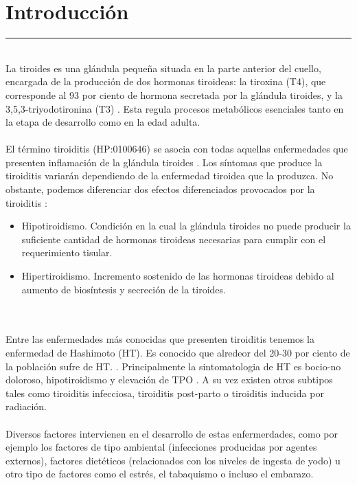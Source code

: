 \section{Introducción}

\hrule
\vspace{5mm}
\\
La tiroides es una glándula pequeña situada en la parte anterior del cuello, encargada de la producción de dos hormonas tiroideas: la tiroxina (T4), que 
corresponde al 93 por ciento de hormona secretada por la glándula tiroides, y la 3,5,3-triyodotironina (T3) \cite{Stegmann} . Esta regula procesos metabólicos esenciales tanto en la etapa de desarrollo como en la edad adulta. \cite{Stegmann} 
\\ \\
El término tiroiditis (HP:0100646) se asocia con todas aquellas enfermedades que presenten inflamación de la glándula tiroides \cite{Sweeney2014}. Los síntomas que produce la tiroiditis variarán dependiendo de la enfermedad tiroidea que la produzca. No obstante, podemos diferenciar dos efectos diferenciados provocados por la tiroiditis \cite{Pulgarin} : 
\begin{itemize}
    \item Hipotiroidismo. Condición en la cual la glándula tiroides no puede producir la suficiente cantidad de hormonas tiroideas necesarias para cumplir con el requerimiento tisular.
    \item Hipertiroidismo. Incremento sostenido de las hormonas tiroideas debido al aumento de biosíntesis y secreción de la tiroides.
\end{itemize} 
\\ \\
Entre las enfermedades más conocidas que presenten tiroiditis tenemos la enfermedad de Hashimoto (HT). Es conocido que alredeor del 20-30 por ciento de la población sufre de HT. \cite{Zheng2020}. Principalmente la sintomatologia de HT es bocio-no doloroso, hipotiroidismo y elevación de TPO \cite{Sweeney2014}. A su vez existen otros subtipos tales como tiroiditis infecciosa, tiroiditis post-parto o tiroiditis inducida por radiación. \cite{Sweeney2014}
\\ \\
 Diversos factores  intervienen en el desarrollo de estas enfermerdades, como por ejemplo los factores de tipo ambiental (infecciones producidas por agentes externos), factores dietéticos (relacionados con los niveles de ingesta de yodo) u otro tipo de factores como el estrés, el tabaquismo o incluso el embarazo. \cite{Hiromatsu}
